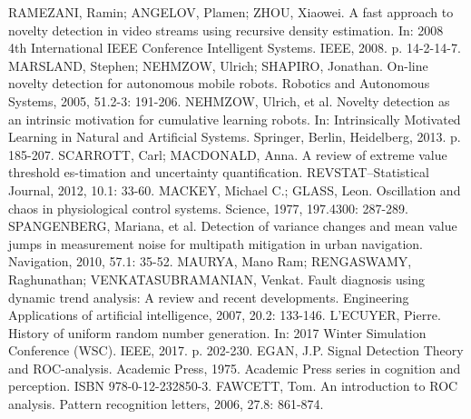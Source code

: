 \documentclass[11pt,twoside,openright]{report}
\begin{document}
\begin{thebibliography}{L}
RAMEZANI, Ramin; ANGELOV, Plamen; ZHOU, Xiaowei. A fast approach to novelty detection in video streams using recursive density estimation. In: 2008 4th International IEEE Conference Intelligent Systems. IEEE, 2008. p. 14-2-14-7.
MARSLAND, Stephen; NEHMZOW, Ulrich; SHAPIRO, Jonathan. On-line novelty detection for autonomous mobile robots. Robotics and Autonomous Systems, 2005, 51.2-3: 191-206.
NEHMZOW, Ulrich, et al. Novelty detection as an intrinsic motivation for cumulative learning robots. In: Intrinsically Motivated Learning in Natural and Artificial Systems. Springer, Berlin, Heidelberg, 2013. p. 185-207.
SCARROTT, Carl; MACDONALD, Anna. A review of extreme value threshold es-timation and uncertainty quantification. REVSTAT–Statistical Journal, 2012, 10.1: 33-60.
MACKEY, Michael C.; GLASS, Leon. Oscillation and chaos in physiological control systems. Science, 1977, 197.4300: 287-289.
SPANGENBERG, Mariana, et al. Detection of variance changes and mean value jumps in measurement noise for multipath mitigation in urban navigation. Navigation, 2010, 57.1: 35-52.
MAURYA, Mano Ram; RENGASWAMY, Raghunathan; VENKATASUBRAMANIAN, Venkat. Fault diagnosis using dynamic trend analysis: A review and recent developments. Engineering Applications of artificial intelligence, 2007, 20.2: 133-146.
L'ECUYER, Pierre. History of uniform random number generation. In: 2017 Winter Simulation Conference (WSC). IEEE, 2017. p. 202-230.
EGAN, J.P. Signal Detection Theory and ROC-analysis. Academic Press, 1975. Academic Press series in cognition and perception. ISBN 978-0-12-232850-3. 
FAWCETT, Tom. An introduction to ROC analysis. Pattern recognition letters, 2006, 27.8: 861-874.


\end{thebibliography}
\end{document}
